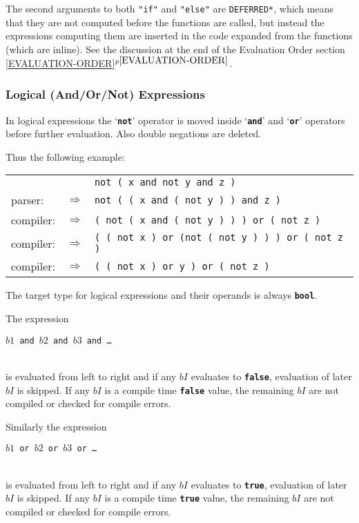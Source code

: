 \documentclass[12pt]{article}
\newcommand{\TT}[1]{{\tt \bfseries #1}}
\newcommand{\itemref}[1]{\ref{#1}$^{p\pageref{#1}}$}
\begin{document}
The second arguments to both {\tt "if"} and {\tt "else"}
are {\tt *DEFERRED*}, which means that they are not computed before
the functions are called, but instead the expressions computing them
are inserted in the code expanded from the functions (which are
inline).  See the discussion at the end of the Evaluation Order section
\itemref{EVALUATION-ORDER}.

\subsubsection{Logical (And/Or/Not) Expressions}

In logical expressions the `\TT{not}' operator is moved inside
`\TT{and}' and `\TT{or}' operators before further evaluation.
Also double negations are deleted.

Thus the following example:
\begin{center}
\begin{tabular}{lcl}
	  &			& \tt not ( x and not y and z ) \\
parser:	  & $\Longrightarrow$ 	& \tt not ( ( x and ( not y ) ) and z ) \\
compiler: & $\Longrightarrow$ 	& \tt ( not ( x and ( not y ) ) ) or
                                                        ( not z ) \\
compiler: & $\Longrightarrow$ 	& \tt ( ( not x ) or (not ( not y ) ) ) or
                                                        ( not z ) \\
compiler: & $\Longrightarrow$ 	& \tt ( ( not x ) or y ) or ( not z ) \\
\end{tabular}
\end{center}

The target type for logical expressions and their operands
is always \TT{bool}.

The expression\\
\centerline{\tt $b1$ and $b2$ and $b3$ and \ldots{}}\\[1ex]
is evaluated from left to right and if any $bI$ evaluates to \TT{false},
evaluation of later $bI$ is skipped.
If any $bI$ is a
compile time \TT{false} value, the remaining $bI$ are not compiled
or checked for compile errors.

Similarly the expression\\
\centerline{\tt $b1$ or $b2$ or $b3$ or \ldots{}}\\[1ex]
is evaluated from left to right and if any $bI$ evaluates to \TT{true},
evaluation of later $bI$ is skipped.
If any $bI$ is a
compile time \TT{true} value, the remaining $bI$ are not compiled
or checked for compile errors.
\end{document}
